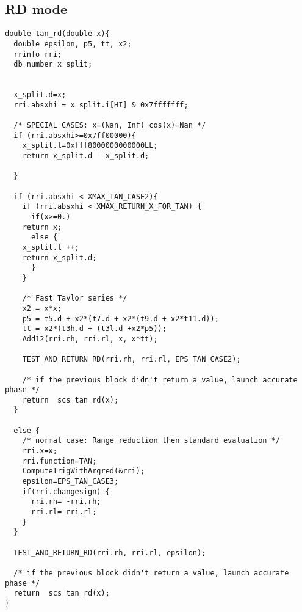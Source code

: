 \subsection{RD mode}
\begin{lstlisting}[caption={Exceptional cases for tangent RD},firstnumber=1]
double tan_rd(double x){  
  double epsilon, p5, tt, x2;
  rrinfo rri;
  db_number x_split;

  
  x_split.d=x;
  rri.absxhi = x_split.i[HI] & 0x7fffffff;
  
  /* SPECIAL CASES: x=(Nan, Inf) cos(x)=Nan */
  if (rri.absxhi>=0x7ff00000){
    x_split.l=0xfff8000000000000LL;
    return x_split.d - x_split.d;

  }   
  
  if (rri.absxhi < XMAX_TAN_CASE2){
    if (rri.absxhi < XMAX_RETURN_X_FOR_TAN) {
      if(x>=0.)
	return x;
      else {
	x_split.l ++;
	return x_split.d;
      }
    }
    
    /* Fast Taylor series */
    x2 = x*x;
    p5 = t5.d + x2*(t7.d + x2*(t9.d + x2*t11.d));
    tt = x2*(t3h.d + (t3l.d +x2*p5));
    Add12(rri.rh, rri.rl, x, x*tt);  
      
    TEST_AND_RETURN_RD(rri.rh, rri.rl, EPS_TAN_CASE2);

    /* if the previous block didn't return a value, launch accurate phase */
    return  scs_tan_rd(x);
  }
  
  else { 
    /* normal case: Range reduction then standard evaluation */
    rri.x=x;
    rri.function=TAN;
    ComputeTrigWithArgred(&rri);
    epsilon=EPS_TAN_CASE3; 
    if(rri.changesign) {
      rri.rh= -rri.rh; 
      rri.rl=-rri.rl;
    }
  }
  
  TEST_AND_RETURN_RD(rri.rh, rri.rl, epsilon);

  /* if the previous block didn't return a value, launch accurate phase */
  return  scs_tan_rd(x);
}
\end{lstlisting}

